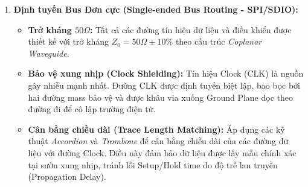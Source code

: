 \begin{enumerate}
                \item \textbf{Định tuyến Bus Đơn cực (Single-ended Bus Routing - SPI/SDIO):}
                \begin{itemize}
                    \item \textbf{Trở kháng $50\Omega$:} Tất cả các đường tín hiệu dữ liệu và điều khiển được thiết kế với trở kháng $Z_0 = 50\Omega \pm 10\%$ theo cấu trúc \textit{Coplanar Waveguide}.
                    \item \textbf{Bảo vệ xung nhịp (Clock Shielding):} Tín hiệu Clock (CLK) là nguồn gây nhiễu mạnh nhất. Đường CLK được định tuyến biệt lập, bao bọc bởi hai đường mass bảo vệ và được khâu via xuống Ground Plane dọc theo đường đi để cô lập trường điện từ.
                    \item \textbf{Cân bằng chiều dài (Trace Length Matching):} Áp dụng các kỹ thuật \textit{Accordion} và \textit{Trombone} để cân bằng chiều dài của các đường dữ liệu với đường Clock. Điều này đảm bảo dữ liệu được lấy mẫu chính xác tại sườn xung nhịp, tránh lỗi Setup/Hold time do độ trễ lan truyền (Propagation Delay).
                \end{itemize}
                

\end{enumerate}
